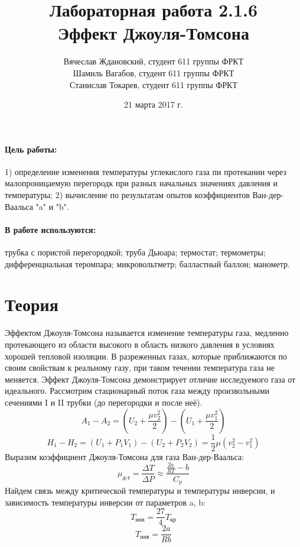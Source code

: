 \documentclass[a4paper]{article}
\title{Лабораторная работа 2.1.6 \\Эффект Джоуля-Томсона}
\date{21 марта 2017 г.}
\author{Вячеслав Ждановский, студент 611 группы ФРКТ\\
Шамиль Вагабов, студент 611 группы ФРКТ\\
Станислав Токарев, студент 611 группы ФРКТ}
\begin{document}
	\maketitle
	\newpage
	\paragraph{Цель работы:} 1) определение изменения температуры углекислого газа пи протекании через малопроницаемую перегородк при разных начальных значениях давления и температуры; 2) вычисление по результатам опытов коэффициентов Ван-дер-Ваальса "a" и "b".
	\paragraph{В работе используются:} трубка с пористой перегородкой; труба Дьюара; термостат; термометры; дифференциальная теромпара; микровольтметр; балластный баллон; манометр.
	\section{Теория}
	Эффектом Джоуля-Томсона называется изменение температуры газа, медленно протекающего из области высокого в область низкого давления в условиях хорошей тепловой изоляции. В разреженных газах, которые приближаются по своим свойствам к реальному газу, при таком течении температура газа не меняется. Эффект Джоуля-Томсона демонстрирует отличие исследуемого газа от идеального.
	Рассмотрим стационарный поток газа между произвольными сечениями I и II трубки (до перегородки и после неё). 
	\begin{equation}
	A_1 - A_2 = \left(U_2 + \frac{\mu v^2_2}{2}\right) - \left(U_1 + \frac{\mu v^2_1}{2}\right)
	\end{equation}
	\begin{equation}
	H_1 - H_2 = (U_1 + P_1 V_1)-(U_2 + P_2 V_2)=\frac{1}{2}\mu (v^2_2-v^2_1)
	\end{equation}
	Выразим коэффициент Джоуля-Томсона для газа Ван-дер-Ваальса:
	\begin{equation}
	\mu_\text{д-т}=\frac{\Delta T}{\Delta P} \approx \frac{\frac{2a}{RT}-b}{C_p}
	\end{equation}
	Найдем связь между критической температуры и температуры инверсии, и зависимость температуры инверсии от параметров a, b: 
	\begin{equation}
	T_\text{инв}=\frac{27}{4}T_\text{кр}
	\end{equation}
	\begin{equation}
	T_\text{инв}=\frac{2a}{Rb}
	\end{equation}
		\newpage
\end{document}
